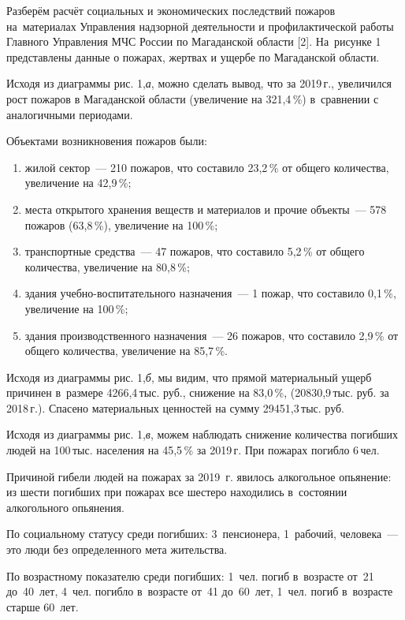  Разберём расчёт социальных и экономических последствий пожаров на~материалах Управления надзорной деятельности и профилактической работы Главного Управления МЧС России по Магаданской области [2]. На~рисунке 1 представлены данные о пожарах, жертвах и ущербе по Магаданской области.



Исходя из диаграммы рис. 1,\textit{а}, можно сделать вывод, что за 2019\,г., увеличился рост пожаров в Магаданской области (увеличение на 321,4\,\%) в~сравнении с аналогичными периодами.

Объектами возникновения пожаров были:
\begin{enumerate}[noitemsep]\vspace{-8pt}
\item жилой сектор~--- 210 пожаров, что составило 23,2\,\% от общего количества, увеличение на 42,9\,\%;
\item места открытого хранения веществ и материалов и прочие объекты~--- 578 пожаров (63,8\,\%), увеличение на 100\,\%;
\item транспортные средства~--- 47 пожаров, что составило 5,2\,\% от общего количества, увеличение на 80,8\,\%;
\item здания учебно-воспитательного назначения~--- 1 пожар, что составило 0,1\,\%, увеличение на 100\,\%;
\item здания производственного назначения~--- 26 пожаров, что составило 2,9\,\% от общего количества, увеличение на 85,7\,\%.
\end{enumerate}
 \vspace{-8pt}

 Исходя из диаграммы рис. 1,\textit{б}, мы видим, что прямой материальный ущерб причинен в~размере 4266,4\,тыс. руб., снижение на 83,0\,\%, (20830,9\,тыс. руб. за 2018\,г.). Спасено материальных ценностей на сумму 29451,3\,тыс. руб.

 Исходя из диаграммы рис. 1,\textit{в}, можем наблюдать снижение количества погибших людей на 100\,тыс. населения на 45,5\,\% за 2019\,г. При пожарах погибло 6\,чел.

 Причиной гибели людей на пожарах за 2019~г. явилось алкогольное
 опьянение: из шести погибших при пожарах все шестеро находились в~состоянии алкогольного опьянения.

 По социальному статусу среди погибших: 3~пенсионера, 1~рабочий, человека~--- это люди без определенного мета жительства.

 По возрастному показателю среди погибших: 1~чел. погиб в~возрасте от~21
 до~40~лет, 4~чел. погибло в~возрасте от~41 до~60~лет, 1~чел. погиб в~возрасте старше 60~лет.

